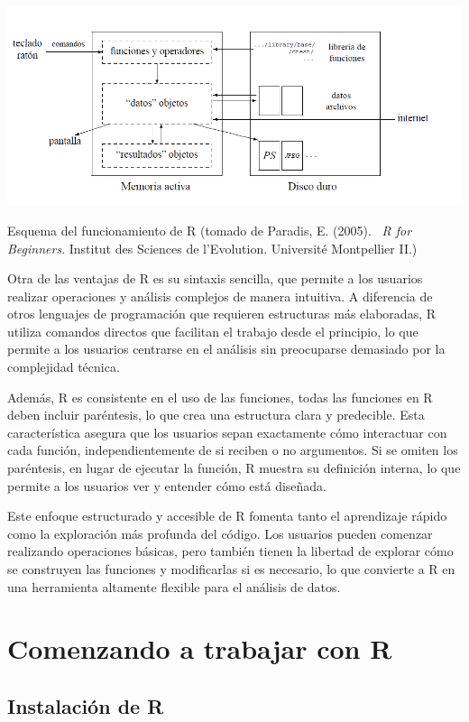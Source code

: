 \documentclass[
  letterpaper,
]{scrbook}
\begin{document}
\includegraphics{Prácticas_2025_26/Práctica_1/images/clipboard-988688670.png}

Esquema del funcionamiento de R (tomado de Paradis, E. (2005).~ \emph{R
for Beginners}. Institut des Sciences de l'Evolution. Université
Montpellier II.)

Otra de las ventajas de R es su sintaxis sencilla, que permite a los
usuarios realizar operaciones y análisis complejos de manera intuitiva.
A diferencia de otros lenguajes de programación que requieren
estructuras más elaboradas, R utiliza comandos directos que facilitan el
trabajo desde el principio, lo que permite a los usuarios centrarse en
el análisis sin preocuparse demasiado por la complejidad técnica.

Además, R es consistente en el uso de las funciones, todas las funciones
en R deben incluir paréntesis, lo que crea una estructura clara y
predecible. Esta característica asegura que los usuarios sepan
exactamente cómo interactuar con cada función, independientemente de si
reciben o no argumentos. Si se omiten los paréntesis, en lugar de
ejecutar la función, R muestra su definición interna, lo que permite a
los usuarios ver y entender cómo está diseñada.

Este enfoque estructurado y accesible de R fomenta tanto el aprendizaje
rápido como la exploración más profunda del código. Los usuarios pueden
comenzar realizando operaciones básicas, pero también tienen la libertad
de explorar cómo se construyen las funciones y modificarlas si es
necesario, lo que convierte a R en una herramienta altamente flexible
para el análisis de datos.

\hypertarget{comenzando-a-trabajar-con-r}{%
\section{Comenzando a trabajar con
R}\label{comenzando-a-trabajar-con-r}}

\hypertarget{instalaciuxf3n-de-r}{%
\subsection{Instalación de R}\label{instalaciuxf3n-de-r}}
\end{document}
